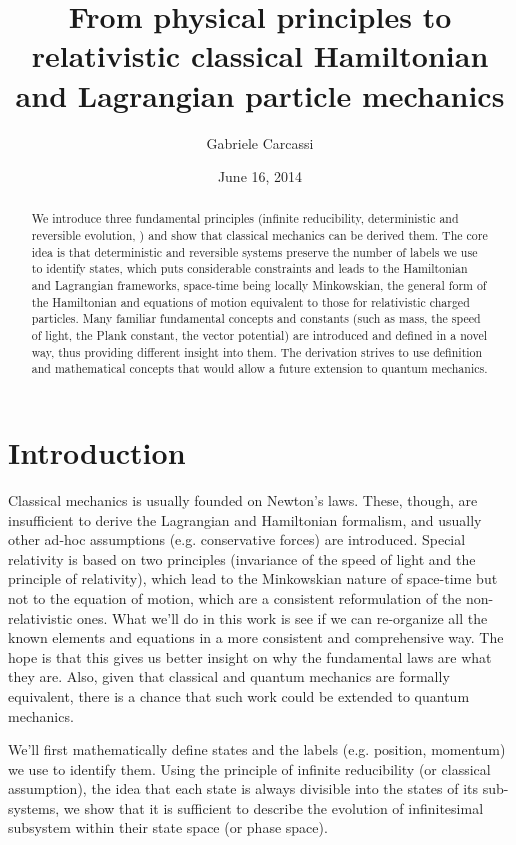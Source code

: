 \documentclass[aps,pra,10pt,twocolumn,floatfix,nofootinbib]{revtex4-1}
\theoremstyle{definition}
\begin{document}
\title{From physical principles to relativistic classical Hamiltonian and Lagrangian particle mechanics}
\author{Gabriele Carcassi}
\date{June 16, 2014}

\begin{abstract}
We introduce three fundamental principles (infinite reducibility, deterministic and reversible evolution, ) and show that classical mechanics can be derived them. The core idea is that deterministic and reversible systems preserve the number of labels we use to identify states, which puts considerable constraints and leads to the Hamiltonian and Lagrangian frameworks, space-time being locally Minkowskian, the general form of the Hamiltonian and equations of motion equivalent to those for relativistic charged particles. Many familiar fundamental concepts and constants (such as mass, the speed of light, the Plank constant, the vector potential) are introduced and defined in a novel way, thus providing different insight into them. The derivation strives to use definition and mathematical concepts that would allow a future extension to quantum mechanics.\end{abstract}
\maketitle

\section{Introduction}
Classical mechanics is usually founded on Newton's laws. These, though, are insufficient to derive the Lagrangian and Hamiltonian formalism, and usually other ad-hoc assumptions (e.g. conservative forces) are introduced. Special relativity is based on two principles (invariance of the speed of light and the principle of relativity), which lead to the Minkowskian nature of space-time but not to the equation of motion, which are a consistent reformulation of the non-relativistic ones. What we'll do in this work is see if we can re-organize all the known elements and equations in a more consistent and comprehensive way. The hope is that this gives us better insight on why the fundamental laws are what they are. Also, given that classical and quantum mechanics are formally equivalent, there is a chance that such work could be extended to quantum mechanics.

We'll first mathematically define states and the labels (e.g. position, momentum) we use to identify them. Using the principle of infinite reducibility (or classical assumption), the idea that each state is always divisible into the states of its sub-systems, we show that it is sufficient to describe the evolution of infinitesimal subsystem within their state space (or phase space).
\end{document}
